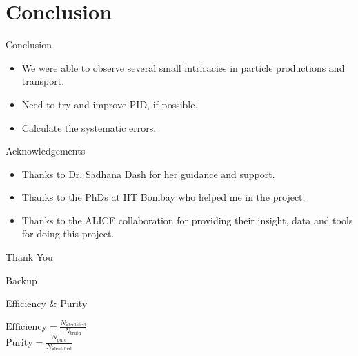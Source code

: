 \documentclass{beamer}
\begin{document}
\section{Conclusion}
\begin{frame}{Conclusion}
	\begin{itemize}
		\item We were able to observe several small intricacies in particle productions and transport.
		\item Need to try and improve PID, if possible.
		\item Calculate the systematic errors.
	\end{itemize}
\end{frame}
\begin{frame}{Acknowledgements}
	\begin{itemize}
		\item Thanks to Dr. Sadhana Dash for her guidance and support.
		\item Thanks to the PhDs at IIT Bombay who helped me in the project.
		\item Thanks to the ALICE collaboration for providing their insight, data and tools for doing this project.
	\end{itemize}
\end{frame}
\begin{frame}
	\centering 
	{\Huge Thank You}
\end{frame}
\begin{frame}
	Backup
\end{frame}
\begin{frame}{Efficiency \& Purity}
	\begin{definition}
		$\mathrm{Efficiency}=\frac{N_{\mathrm{identified}}}{N_{\mathrm{truth}}}$\\
		$\mathrm{Purity}=\frac{N_{\mathrm{pure}}}{N_{\mathrm{identified}}}$
	\end{definition}
\end{frame}
\end{document}
